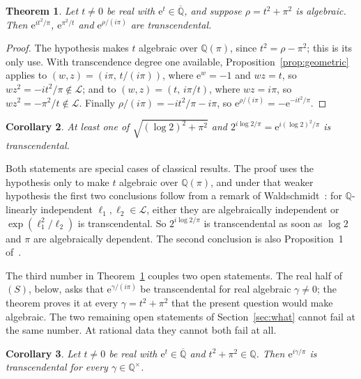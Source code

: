 \documentclass[11pt,a4paper]{article}
\theoremstyle{plain}
\newtheorem{theorem}{Theorem}[section]
\newtheorem{corollary}[theorem]{Corollary}
\theoremstyle{definition}
\newcommand{\e}{\mathrm{e}}
\newcommand{\Q}{\mathbb{Q}}
\newcommand{\Alg}{\overline{\mathbb{Q}}}
\newcommand{\Logs}{\mathcal{L}}
\begin{document}
\begin{theorem}\label{thm:diaz-number}
Let $t\neq0$ be real with $\e^{t}\in\Alg$, and suppose $\rho=t^{2}+\pi^{2}$ is algebraic. Then
$\e^{it^{2}/\pi}$, $\e^{\pi^{2}/t}$ and $\e^{\rho/(i\pi)}$ are transcendental.
\end{theorem}

\begin{proof}
The hypothesis makes $t$ algebraic over $\Q(\pi)$, since $t^{2}=\rho-\pi^{2}$; this is its only
use. With transcendence degree one available, Proposition~\ref{prop:geometric} applies to
$(w,z)=(i\pi,\,t/(i\pi))$, where $\e^{w}=-1$ and $wz=t$, so $wz^{2}=-it^{2}/\pi\notin\Logs$; and to
$(w,z)=(t,\,i\pi/t)$, where $wz=i\pi$, so $wz^{2}=-\pi^{2}/t\notin\Logs$. Finally
$\rho/(i\pi)=-it^{2}/\pi-i\pi$, so $\e^{\rho/(i\pi)}=-\e^{-it^{2}/\pi}$.
\end{proof}

\begin{corollary}\label{cor:log2}
At least one of $\sqrt{(\log 2)^{2}+\pi^{2}}$ and $2^{i\log2/\pi}=\e^{i(\log2)^{2}/\pi}$ is
transcendental.
\end{corollary}

Both statements are special cases of classical results. The proof uses the hypothesis only to make
$t$ algebraic over $\Q(\pi)$, and under that weaker hypothesis the first two conclusions follow from
a remark of Waldschmidt~\cite[p.~202]{waldschmidt-1974}: for $\Q$-linearly independent
$\ell_{1},\ell_{2}\in\Logs$, either they are algebraically independent or $\exp(\ell_{1}^{2}/\ell_{2})$ is
transcendental. So $2^{i\log2/\pi}$ is transcendental as soon as $\log2$ and $\pi$ are algebraically
dependent. The second conclusion is also Proposition~1 of~\cite{diaz-1997}.

The third number in Theorem~\ref{thm:diaz-number} couples two open statements. The real half of
$(S)$, below, asks that $\e^{\gamma/(i\pi)}$ be transcendental for real algebraic $\gamma\neq0$;
the theorem proves it at every $\gamma=t^{2}+\pi^{2}$ that the present question would make
algebraic. The two remaining open statements of Section~\ref{sec:what} cannot fail at the same
number. At rational data they cannot both fail at all.

\begin{corollary}\label{cor:rational-exclusion}
Let $t\neq0$ be real with $\e^{t}\in\Alg$ and $t^{2}+\pi^{2}\in\Q$. Then $\e^{i\gamma/\pi}$ is
transcendental for every $\gamma\in\Q^{\times}$.
\end{corollary}
\end{document}
